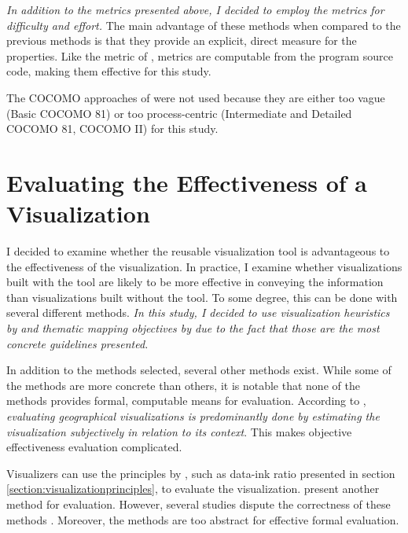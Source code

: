 \emph{In addition to the metrics presented above, I decided to employ the \citeauthor{halstead_elements_1977} metrics for difficulty and effort.} The main advantage of these methods when compared to the previous methods is that they provide an explicit, direct measure for the properties. Like the metric of \citeauthor{mccabe_complexity_1976}, \citeauthor{halstead_elements_1977} metrics are computable from the program source code, making them effective for this study.

The COCOMO approaches of \citet{boehm_software_1981} were not used because they are either too vague (Basic COCOMO 81) or too process-centric (Intermediate and Detailed COCOMO 81, COCOMO II) for this study.

\section{Evaluating the Effectiveness of a Visualization}

I decided to examine whether the reusable visualization tool is advantageous to the effectiveness of the visualization. In practice, I examine whether visualizations built with the tool are likely to be more effective in conveying the information than visualizations built without the tool. To some degree, this can be done with several different methods. \emph{In this study, I decided to use visualization heuristics by \citet{zuk_heuristics_2006} and thematic mapping objectives by \citet{schlichtmann_visualization_2002} due to the fact that those are the most concrete guidelines presented.}

In addition to the methods selected, several other methods exist. While some of the methods are more concrete than others, it is notable that none of the methods provides formal, computable means for evaluation. According to \citet{kraak_cartographic_1998}, \emph{evaluating geographical visualizations is predominantly done by estimating the visualization subjectively in relation to its context}. This makes objective effectiveness evaluation complicated.

Visualizers can use the principles by \citet{tufte_visual_1986}, such as data-ink ratio presented in section \ref{section:visualizationprinciples}, to evaluate the visualization. \citet{azzam_j-b_2013} present another method for evaluation. However, several studies dispute the correctness of these methods \citep{kosslyn_graphics_1985,inbar_minimalism_2007}. Moreover, the methods are too abstract for effective formal evaluation.


